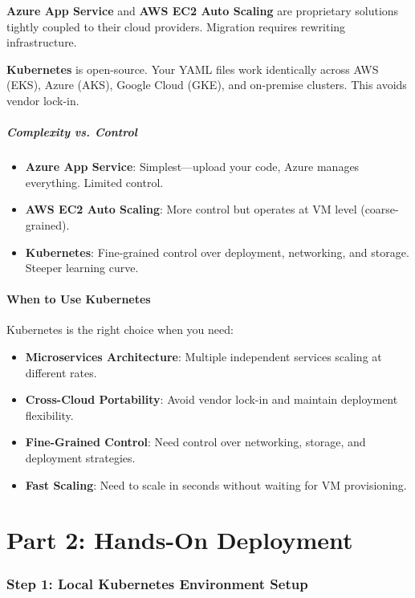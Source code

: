 \documentclass[12pt,a4paper]{article}
\begin{document}
\textbf{Azure App Service} and \textbf{AWS EC2 Auto Scaling} are proprietary solutions tightly coupled to their cloud providers. Migration requires rewriting infrastructure.

\textbf{Kubernetes} is open-source. Your YAML files work identically across AWS (EKS), Azure (AKS), Google Cloud (GKE), and on-premise clusters. This avoids vendor lock-in.

\subsubsection{Complexity vs. Control}

\begin{itemize}
    \item \textbf{Azure App Service}: Simplest—upload your code, Azure manages everything. Limited control.
    \item \textbf{AWS EC2 Auto Scaling}: More control but operates at VM level (coarse-grained).
    \item \textbf{Kubernetes}: Fine-grained control over deployment, networking, and storage. Steeper learning curve.
\end{itemize}

\subsection{When to Use Kubernetes}

Kubernetes is the right choice when you need:

\begin{itemize}
    \item \textbf{Microservices Architecture}: Multiple independent services scaling at different rates.
    \item \textbf{Cross-Cloud Portability}: Avoid vendor lock-in and maintain deployment flexibility.
    \item \textbf{Fine-Grained Control}: Need control over networking, storage, and deployment strategies.
    \item \textbf{Fast Scaling}: Need to scale in seconds without waiting for VM provisioning.
\end{itemize}

\newpage

\part{Part 2: Hands-On Deployment}

\section{Step 1: Local Kubernetes Environment Setup}
\end{document}
